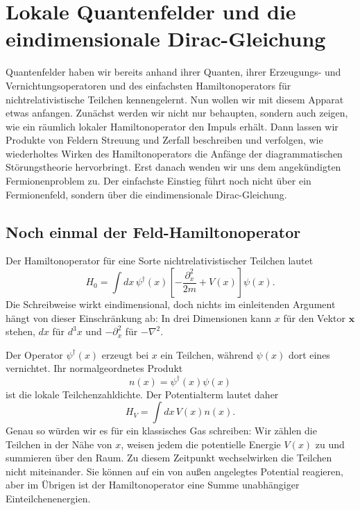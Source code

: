 \chapter{Lokale Quantenfelder und die eindimensionale Dirac-Gleichung}

Quantenfelder haben wir bereits anhand ihrer Quanten, ihrer Erzeugungs- und Vernichtungsoperatoren und des einfachsten Hamiltonoperators für nichtrelativistische Teilchen kennengelernt. Nun wollen wir mit diesem Apparat etwas anfangen. Zunächst werden wir nicht nur behaupten, sondern auch zeigen, wie ein räumlich lokaler Hamiltonoperator den Impuls erhält. Dann lassen wir Produkte von Feldern Streuung und Zerfall beschreiben und verfolgen, wie wiederholtes Wirken des Hamiltonoperators die Anfänge der diagrammatischen Störungstheorie hervorbringt. Erst danach wenden wir uns dem angekündigten Fermionenproblem zu. Der einfachste Einstieg führt noch nicht über ein Fermionenfeld, sondern über die eindimensionale Dirac-Gleichung.

\section{Noch einmal der Feld-Hamiltonoperator}

Der Hamiltonoperator für eine Sorte nichtrelativistischer Teilchen lautet
\begin{equation}
H_0=\int dx\,
\psi^\dagger(x)
\left[-\frac{\partial_x^2}{2m}+V(x)\right]
\psi(x).
\label{eq:l9-nonrel-hamiltonian}
\end{equation}
Die Schreibweise wirkt eindimensional, doch nichts im einleitenden Argument hängt von dieser Einschränkung ab: In drei Dimensionen kann \(x\) für den Vektor \(\mathbf{x}\) stehen, \(dx\) für \(d^3x\) und \(-\partial_x^2\) für \(-\nabla^2\).

Der Operator \(\psi^\dagger(x)\) erzeugt bei \(x\) ein Teilchen, während \(\psi(x)\) dort eines vernichtet. Ihr normalgeordnetes Produkt
\begin{equation}
n(x)=\psi^\dagger(x)\psi(x)
\end{equation}
ist die lokale Teilchenzahldichte. Der Potentialterm lautet daher
\begin{equation}
H_V=\int dx\,V(x)n(x).
\end{equation}
Genau so würden wir es für ein klassisches Gas schreiben: Wir zählen die Teilchen in der Nähe von \(x\), weisen jedem die potentielle Energie \(V(x)\) zu und summieren über den Raum. Zu diesem Zeitpunkt wechselwirken die Teilchen nicht miteinander. Sie können auf ein von außen angelegtes Potential reagieren, aber im Übrigen ist der Hamiltonoperator eine Summe unabhängiger Einteilchenenergien.


